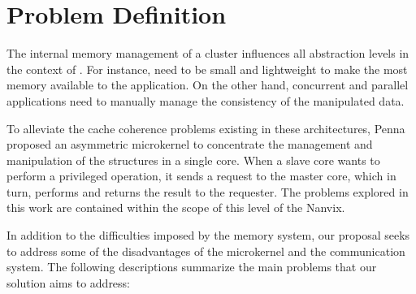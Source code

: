\section{Problem Definition}
\label{sec:problem}

	The internal memory management of a cluster influences all abstraction
	levels in the context of \lws. For instance, \oses need to be small and
	lightweight to make the most memory available to the application. On the
	other hand, concurrent and parallel applications need to manually manage
	the consistency of the manipulated data.

	To alleviate the cache coherence problems existing in these architectures,
	Penna \etal~\cite{Penna:Microkernel} proposed an asymmetric microkernel to
	concentrate the management and manipulation of the \os structures in
	a single core. When a slave core wants to perform a privileged operation,
	it sends a request to the master core, which in turn, performs and returns
	the result to the requester. The problems explored in this work are
	contained within the scope of this level of the Nanvix.

	In addition to the difficulties imposed by the memory system, our proposal
	seeks to address some of the disadvantages of the microkernel and the
	communication system. The following descriptions summarize the main
	problems that our solution aims to address:

